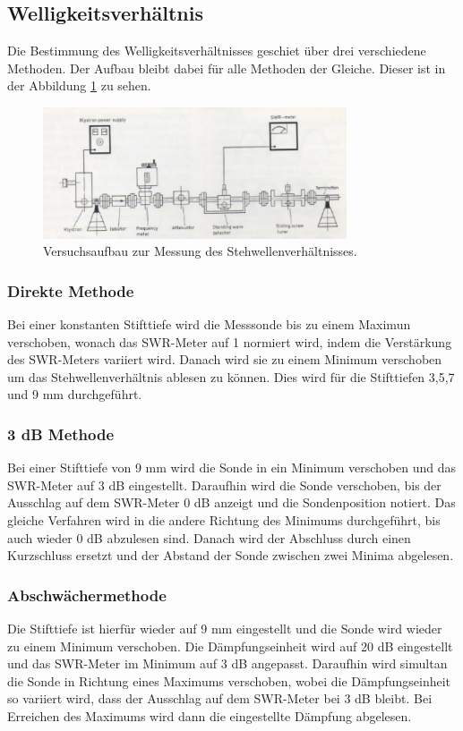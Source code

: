 \subsection{Welligkeitsverhältnis}

Die Bestimmung des Welligkeitsverhältnisses geschiet über drei verschiedene Methoden. Der Aufbau bleibt dabei für alle Methoden der Gleiche. Dieser ist in der Abbildung \ref{fig:swr} zu sehen.

\begin{figure}
    \centering
    \includegraphics[width=0.8\textwidth]{Bilder/aufbau_swr.png}
    \caption{Versuchsaufbau zur Messung des Stehwellenverhältnisses.}
    \label{fig:swr}
\end{figure}
\FloatBarrier


\subsubsection{Direkte Methode}
 
Bei einer konstanten Stifttiefe wird die Messsonde bis zu einem Maximun verschoben, wonach das SWR-Meter auf 1 normiert wird, indem die Verstärkung des SWR-Meters variiert wird. Danach wird sie zu
einem Minimum verschoben um das Stehwellenverhältnis ablesen zu können. Dies wird für die Stifttiefen 3,5,7 und 9 $\si{\mm}$ durchgeführt.

\subsubsection{3 dB Methode}
Bei einer Stifttiefe von 9 mm wird die Sonde in ein Minimum verschoben und das SWR-Meter auf 3 dB eingestellt. Daraufhin wird die Sonde verschoben, bis 
der Ausschlag auf dem SWR-Meter 0 dB anzeigt und die Sondenposition notiert. Das gleiche Verfahren wird in die andere Richtung des Minimums durchgeführt, bis auch wieder 0 dB 
abzulesen sind. Danach wird der Abschluss durch einen Kurzschluss ersetzt und der Abstand der Sonde zwischen zwei Minima abgelesen.


\subsubsection{Abschwächermethode}
Die Stifttiefe ist hierfür wieder auf 9 mm eingestellt und die Sonde wird wieder zu einem Minimum verschoben. Die Dämpfungseinheit wird auf 20 dB eingestellt und das SWR-Meter im 
Minimum auf 3 dB angepasst. Daraufhin wird simultan die Sonde in Richtung eines Maximums verschoben, wobei die Dämpfungseinheit so variiert wird, dass der Ausschlag auf dem SWR-Meter 
bei 3 dB bleibt. Bei Erreichen des Maximums wird dann die eingestellte Dämpfung abgelesen. 
